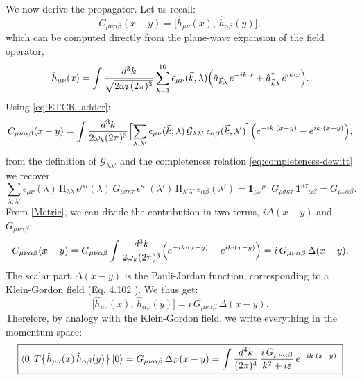 \documentclass[12pt,a4paper,oneside]{article}
\numberwithin{equation}{section}   %
\begin{document}
We now derive the propagator. Let us recall:
\begin{equation}
  C_{\mu\nu\alpha\beta}(x-y)
  = \bigl[\hat{h}_{\mu\nu}(x),\, \hat{h}_{\alpha\beta}(y)\bigr],
\end{equation}
which can be computed directly from the plane-wave expansion of the field operator,
\begin{equation}
  \hat h_{\mu\nu}(x)=\int\frac{d^3k}{\sqrt{2\omega_k(2\pi)^3}}\sum_{\lambda=1}^{10}
  \epsilon_{\mu\nu}(\vec k,\lambda)\Bigl(\hat a_{\vec k\lambda}\,e^{-ik\cdot x}
  +\hat a^\dagger_{\vec k\lambda}\,e^{ik\cdot x}\Bigr).
\end{equation}
Using \eqref{eq:ETCR-ladder}:
\begin{equation}
  C_{\mu\nu\alpha\beta}(x-y)=\int\frac{d^3k}{2\omega_k(2\pi)^3}
  \Bigl[\sum_{\lambda,\lambda'}\epsilon_{\mu\nu}(\vec k,\lambda)\,
  \mathcal G_{\lambda\lambda'}\,\epsilon_{\alpha\beta}(\vec k,\lambda')\Bigr]
  \Bigl(e^{-ik\cdot(x-y)}-e^{ik\cdot(x-y)}\Bigr),
\end{equation}
from the definition of $\mathcal G_{\lambda\lambda'}$ and the completeness
relation \eqref{eq:completeness-dewitt} we recover
\begin{equation} \label{Metric}
  \sum_{\lambda,\lambda'}\epsilon_{\mu\nu}(\lambda)\,\mathrm{H}_{\lambda\lambda}\,
  \epsilon^{\rho\sigma}(\lambda)\,G_{\rho\sigma\kappa\tau}\,
  \epsilon^{\kappa\tau}(\lambda')\,\mathrm{H}_{\lambda'\lambda'}\,\epsilon_{\alpha\beta}(\lambda')
  =\mathbf 1_{\mu\nu}{}^{\rho\sigma}\,G_{\rho\sigma\kappa\tau}\,
  \mathbf 1^{\kappa\tau}{}_{\alpha\beta}
  =G_{\mu\nu\alpha\beta}.
\end{equation}
From \eqref{Metric}, we can divide the contribution in two terms, $i\Delta (x-y)$
and $G_{\mu\nu\alpha\beta}$:
\begin{equation}
  C_{\mu\nu\alpha\beta}(x-y)=G_{\mu\nu\alpha\beta}\int\frac{d^3k}{2\omega_k(2\pi)^3}
  \Bigl(e^{-ik\cdot(x-y)}-e^{ik\cdot(x-y)}\Bigr)
  = i\,G_{\mu\nu\alpha\beta}\,\Delta(x-y),
\end{equation}
The scalar part $\Delta (x-y)$ is the Pauli-Jordan function, 
corresponding to a Klein-Gordon field (Eq. 4.102 \cite{GreinerFQ}).
We thus get:
\begin{equation}
  \bigl[\hat{h}_{\mu\nu}(x),\, \hat{h}_{\alpha\beta}(y)\bigr]
  = i\, G_{\mu\nu\alpha\beta}\, \Delta(x-y).
\end{equation}
Therefore, by analogy with the Klein-Gordon field, 
we write everything in the momentum space:
\begin{equation}
\boxed{
  \bra{0} T\bigl\{\hat{h}_{\mu\nu}(x)\, \hat{h}_{\alpha\beta}(y)\bigr\} \ket{0}
  = G_{\mu\nu\alpha\beta}\, \Delta_F(x-y)
  = \int \frac{d^4k}{(2\pi)^4}\,
    \frac{i\, G_{\mu\nu\alpha\beta}}{k^2 + i\varepsilon}\, e^{-ik\cdot(x-y)} .
}
\end{equation}
\end{document}
